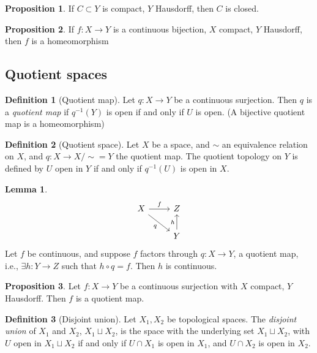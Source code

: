 \documentclass[a4paper,14pt]{extarticle}
\theoremstyle{definition}
\newtheorem*{definition}{Definition}
\newtheorem*{lemma}{Lemma}
\newtheorem*{proposition}{Proposition}
\begin{document}
\begin{proposition}
  If $C\subset Y$ is compact, $Y$ Hausdorff, then $C$ is closed.
\end{proposition}

\begin{proposition}
  If $f:X\rightarrow Y$ is a continuous bijection, $X$ compact, $Y$ Hausdorff, then $f$ 
  is a homeomorphism
\end{proposition}

\subsection{Quotient spaces}
\begin{definition}[Quotient map]
  Let $q:X\rightarrow Y$ be a continuous surjection. Then $q$ is a \emph{quotient map}
  if $q^{-1}(Y)$ is open if and only if $U$ is open. (A bijective quotient map is a 
  homeomorphism)
\end{definition}

\begin{definition}[Quotient space]
  Let $X$ be a space, and $\sim$ an equivalence relation on $X$, and 
  $q:X\rightarrow X/\sim = Y$ the quotient map. The quotient topology on $Y$ is defined by
  $U$ open in $Y$ if and only if $q^{-1}(U)$ is open in $X$.
\end{definition}

\begin{lemma}
  \[
  \begin{tikzcd}
    X \arrow{r}{f} \arrow[swap]{dr}{q} & Z  \\
     & Y \arrow{u}{h}
  \end{tikzcd}
\]
  Let $f$ be continuous, and suppose $f$ factors through $q:X\rightarrow Y$, a quotient 
  map, i.e., $\exists h:Y\rightarrow Z$ such that $h\circ q = f$. Then $h$ is continuous.
\end{lemma}

\begin{proposition}
  Let $f:X\rightarrow Y$ be a continuous surjection with $X$ compact, $Y$ Hausdorff. Then 
  $f$ is a quotient map. 
\end{proposition}

\begin{definition}[Disjoint union]
  Let $X_1,X_2$ be topological spaces. The \emph{disjoint union} of $X_1$ and $X_2$,
  $X_1\sqcup X_2$, is the space with the underlying set $X_1\sqcup X_2$, with $U$ open 
  in $X_1\sqcup X_2$ if and only if $U\cap X_1$ is open in $X_1$, and $U\cap X_2$ is 
  open in $X_2$.
\end{definition}
\end{document}
